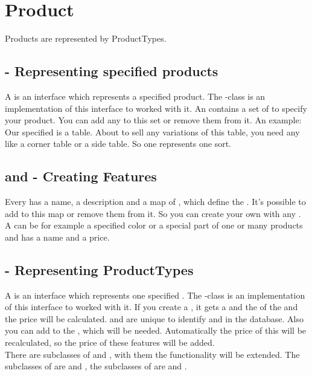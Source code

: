 \section{Product}

Products are represented by ProductTypes.

\subsection{ - Representing specified products}
A  is an interface which represents a specified product. The -class is an implementation of this interface to worked with it.
An  contains a set of  to specify your product. You can add any   to this set or remove them from it.
An example: Our specified  is a table. About to sell any variations of this table, you need any  like a corner table or a side table. 
So one  represents one sort.

\subsection{ and  - Creating Features}
Every  has a name, a description and a map of , which define the . It's possible to add 
 to this map or remove them from it. So you can create your own  with any .\\
A  can be for example a specified color or a special part of one or many products and has a name and a price.   

\subsection{ - Representing ProductTypes}
A  is an interface which represents one specified . The -class is an implementation of this interface to worked with it.
If you create a , it gets a  and the  of the  and the price will be calculated.
 and  are unique  to identify  and  in the database. 
Also you can add  to the , which will be needed. Automatically the price of this  will be recalculated, 
so the price of these features will be added.\\
There are subclasses of  and , with them the functionality will be extended. The subclasses of  are  and 
, the subclasses of  are  and . 

